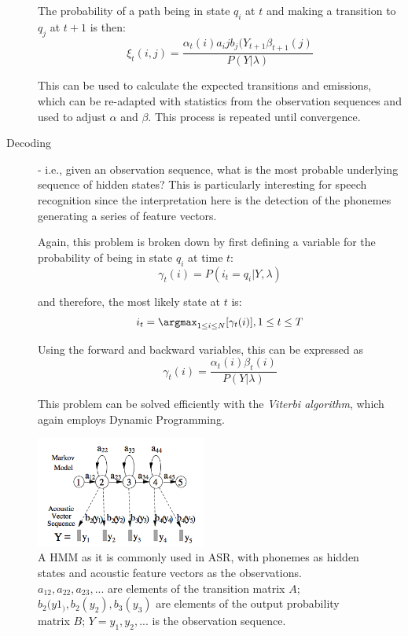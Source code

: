 \begin{description}
        The probability of a path being in state $q_i$ at $t$ and making a transition to $q_j$ at $t+1$ is then:
        \begin{equation}
            \xi_{t}(i, j) = \frac{\alpha_t(i)a_ij b_j (Y_{t+1} \beta_{t+1}(j)}{P(Y|\lambda)}
        \end{equation}

        This can be used to calculate the expected transitions and emissions, which can be re-adapted with statistics from the observation sequences and used to adjust $\alpha$ and $\beta$. 
        This process is repeated until convergence.

        \item[Decoding] - i.e., given an observation sequence, what is the most probable underlying sequence of hidden states? 
        This is particularly interesting for speech recognition since the interpretation here is the detection of the phonemes generating a series of feature vectors.

        Again, this problem is broken down by first defining a variable for the probability of being in state $q_i$ at time $t$:
        \begin{equation}
            \gamma_t(i) = P(i_t = q_i | Y, \lambda )
        \end{equation}

        and therefore, the most likely state at $t$ is:
        \begin{equation}
            i_t = \argmax_{1 \leq i \leq N}[\gamma_t(i)], 1 \leq t \leq T
        \end{equation}

        Using the forward and backward variables, this can be expressed as
        \begin{equation}
            \gamma_t(i) = \frac{\alpha_t(i) \beta_t(i)}{P(Y | \lambda)}
        \end{equation}

        This problem can be solved efficiently with the \textit{Viterbi algorithm}, which again employs Dynamic Programming.
    \end{description}

    \begin{figure}
        \begin{center}
            \includegraphics[width=0.5\textwidth]{figures/asr_hmm.png}
            \caption{A HMM as it is commonly used in ASR, with phonemes as hidden states and acoustic feature vectors as the observations. $a_12, a_22, a_23,...$ are elements of the transition matrix $A$; $b_2(y1_), b_2(y_2), b_3(y_3)$ are elements of the output probability matrix $B$; $Y = y_1,y_2,...$ is the observation sequence. \cite{gales_young_hmm}}
            \label{fig:asr_hmm}
        \end{center}
    \end{figure}